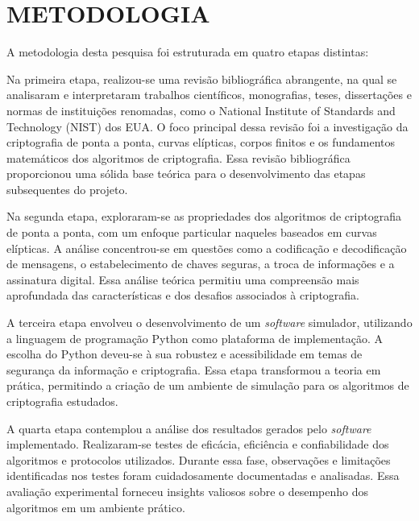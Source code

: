 \section{METODOLOGIA}

A metodologia desta pesquisa foi estruturada em quatro etapas distintas:

Na primeira etapa, realizou-se uma revisão bibliográfica abrangente, na qual se
analisaram e interpretaram trabalhos científicos, monografias, teses,
dissertações e normas de instituições renomadas, como o National Institute of
Standards and Technology (NIST) dos EUA. O foco principal dessa revisão foi a
investigação da criptografia de ponta a ponta, curvas elípticas, corpos finitos
e os fundamentos matemáticos dos algoritmos de criptografia. Essa revisão
bibliográfica proporcionou uma sólida base teórica para o desenvolvimento das
etapas subsequentes do projeto.

Na segunda etapa, exploraram-se as propriedades dos algoritmos de criptografia
de ponta a ponta, com um enfoque particular naqueles baseados em curvas
elípticas. A análise concentrou-se em questões como a codificação e
decodificação de mensagens, o estabelecimento de chaves seguras, a troca de
informações e a assinatura digital. Essa análise teórica permitiu uma
compreensão mais aprofundada das características e dos desafios associados à
criptografia.

A terceira etapa envolveu o desenvolvimento de um \textit{software} simulador,
utilizando a linguagem de programação Python como plataforma de implementação.
A escolha do Python deveu-se à sua robustez e acessibilidade em temas de
segurança da informação e criptografia. Essa etapa transformou a teoria em
prática, permitindo a criação de um ambiente de simulação para os algoritmos de
criptografia estudados.

A quarta etapa contemplou a análise dos resultados gerados pelo
\textit{software} implementado. Realizaram-se testes de eficácia, eficiência e
confiabilidade dos algoritmos e protocolos utilizados. Durante essa fase,
observações e limitações identificadas nos testes foram cuidadosamente
documentadas e analisadas. Essa avaliação experimental forneceu insights
valiosos sobre o desempenho dos algoritmos em um ambiente prático.
